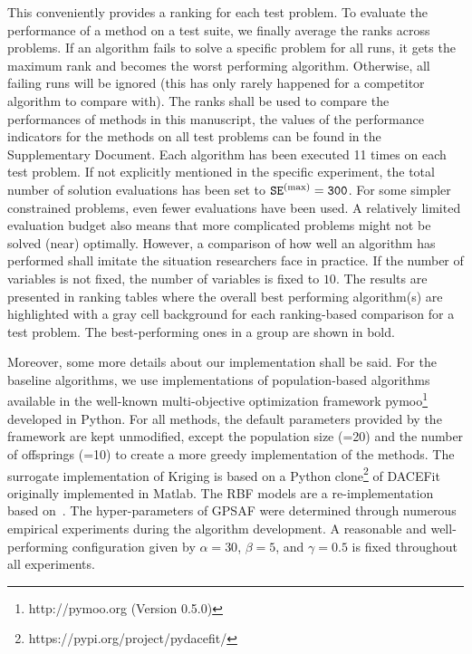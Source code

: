 \documentclass[journal]{IEEEtran}
\begin{document}
This conveniently provides a ranking for each test problem. To evaluate the performance of a method on a test suite, we finally average the ranks across problems. 
If an algorithm fails to solve a specific problem for all runs, it gets the maximum rank and becomes the worst performing algorithm. Otherwise, all failing runs will be ignored (this has only rarely happened for a competitor algorithm to compare with).
The ranks shall be used to compare the performances of methods in this manuscript, the values of the performance indicators for the methods on all test problems can be found in the Supplementary Document.
Each algorithm has been executed 11 times on each test problem. If not explicitly mentioned in the specific experiment, the total number of solution evaluations has been set to $\tt{SE}^{(\max)}=300$. For some simpler constrained problems, even fewer evaluations have been used. 
A relatively limited evaluation budget also means that more complicated problems might not be solved (near) optimally.
However, a comparison of how well an algorithm has performed shall imitate the situation researchers face in practice.
If the number of variables is not fixed, the number of variables is fixed to $10$.
The results are presented in ranking tables where the overall best performing algorithm(s) are highlighted with a gray cell background for each ranking-based comparison for a test problem. The best-performing ones in a group are shown in bold.

Moreover, some more details about our implementation shall be said. For the baseline algorithms, we use implementations of population-based algorithms available in the well-known multi-objective optimization framework pymoo\footnote{http://pymoo.org (Version 0.5.0)}~\cite{2020-blank-pymoo} developed in Python. For all methods, the default parameters provided by the framework are kept unmodified, except the population size (=20) and the number of offsprings (=10) to create a more greedy implementation of the methods.
The surrogate implementation of Kriging is based on a Python clone\footnote{https://pypi.org/project/pydacefit/} of DACEFit~\cite{2002-lophaven-DACE} originally implemented in Matlab. The RBF models are a re-implementation based on~\cite{2017-bagheri-sacobra}.
The hyper-parameters of GPSAF were determined through numerous empirical experiments during the algorithm development.
A reasonable and well-performing configuration given by $\alpha=30$, $\beta=5$, and $\gamma=0.5$ is fixed throughout all experiments.
\end{document}
